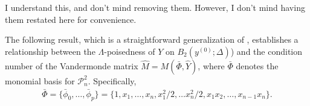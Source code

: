 \documentclass{article}
\begin{document}
\color{magenta}
I understand this, and don't mind removing them.
However, I don't mind having them restated here for convenience.
\color{black}









The following result, which is a straightforward generalization of  \cite[Theorem 3.14]{introduction_book},  establishes a relationship between the $\Lambda$-poisedness of $Y$ on $B_2(y^{(0)};\Delta)$) and the condition number of the Vandermonde matrix $\hat{M} = M(\bar{\Phi},\hat{Y})$, where $\bar{\Phi}$ denotes the monomial basis for $\mathcal{P}^2_n$.  Specifically,
\begin{align}
\label{define_monomial}
\bar{\Phi} = \{ \bar{\phi}_0, \ldots, \bar{\phi}_p\} =\{1, x_1, \ldots, x_n, x_1^2/2, \ldots x_n^2/2,x_1 x_2, \ldots, x_{n-1}x_{n}\}.
\end{align}

\end{document}
